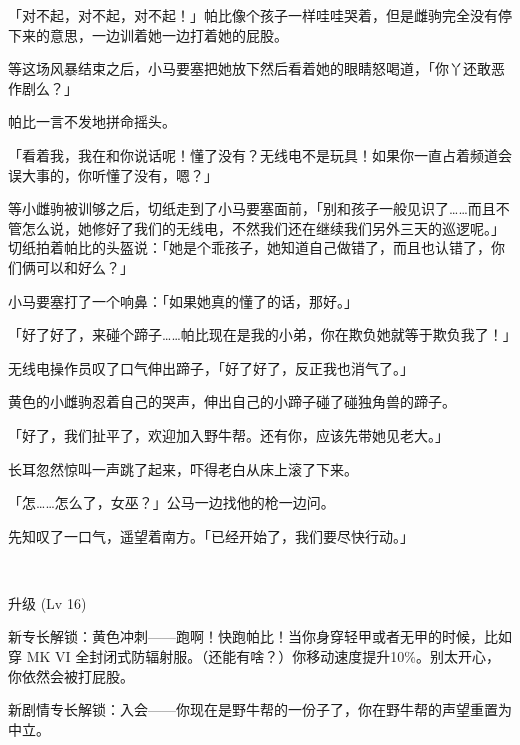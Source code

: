 「对不起，对不起，对不起！」帕比像个孩子一样哇哇哭着，但是雌驹完全没有停下来的意思，一边训着她一边打着她的屁股。

等这场风暴结束之后，小马要塞把她放下然后看着她的眼睛怒喝道，「你丫还敢恶作剧么？」

帕比一言不发地拼命摇头。

「看着我，我在和你说话呢！懂了没有？无线电不是玩具！如果你一直占着频道会误大事的，你听懂了没有，嗯？」

等小雌驹被训够之后，切纸走到了小马要塞面前，「别和孩子一般见识了……而且不管怎么说，她修好了我们的无线电，不然我们还在继续我们另外三天的巡逻呢。」切纸拍着帕比的头盔说：「她是个乖孩子，她知道自己做错了，而且也认错了，你们俩可以和好么？」

小马要塞打了一个响鼻：「如果她真的懂了的话，那好。」

「好了好了，来碰个蹄子……帕比现在是我的小弟，你在欺负她就等于欺负我了！」

无线电操作员叹了口气伸出蹄子，「好了好了，反正我也消气了。」

黄色的小雌驹忍着自己的哭声，伸出自己的小蹄子碰了碰独角兽的蹄子。

「好了，我们扯平了，欢迎加入野牛帮。还有你，应该先带她见老大。」

\horizonline


长耳忽然惊叫一声跳了起来，吓得老白从床上滚了下来。

「怎……怎么了，女巫？」公马一边找他的枪一边问。

先知叹了一口气，遥望着南方。「已经开始了，我们要尽快行动。」

~\vfill

\begin{note}
    升级 (Lv 16) 

    新专长解锁：黄色冲刺——跑啊！快跑帕比！当你身穿轻甲或者无甲的时候，比如穿 MK VI 全封闭式防辐射服。（还能有啥？）你移动速度提升10\%。别太开心，你依然会被打屁股。

    新剧情专长解锁：入会——你现在是野牛帮的一份子了，你在野牛帮的声望重置为中立。
\end{note}


